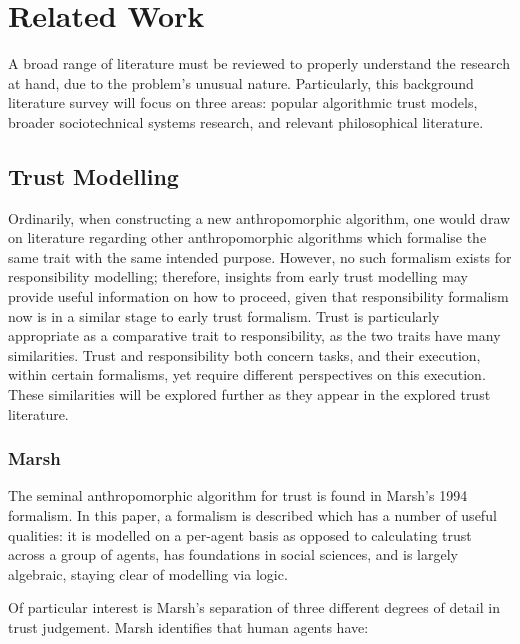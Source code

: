 \section{Related Work}\label{sec:related_work}
A broad range of literature must be reviewed to properly understand the research at hand, due to the problem's unusual nature. Particularly, this background literature survey will focus on three areas: popular algorithmic trust models, broader sociotechnical systems research, and relevant philosophical literature.\par

\subsection{Trust Modelling}
Ordinarily, when constructing a new anthropomorphic algorithm, one would draw on literature regarding other anthropomorphic algorithms which formalise the same trait with the same intended purpose. However, no such formalism exists for responsibility modelling; therefore, insights from early trust modelling may provide useful information on how to proceed, given that responsibility formalism now is in a similar stage to early trust formalism. Trust is particularly appropriate as a comparative trait to responsibility, as the two traits have many similarities. Trust and responsibility both concern tasks, and their execution, within certain formalisms, yet require different perspectives on this execution. These similarities will be explored further as they appear in the explored trust literature.\par

\subsubsection{Marsh}
The seminal anthropomorphic algorithm for trust is found in Marsh's 1994 formalism\cite{Marsh1994FormalisingConcept}. In this paper, a formalism is described which has a number of useful qualities: it is modelled on a per-agent basis as opposed to calculating trust across a group of agents, has foundations in social sciences, and is largely algebraic, staying clear of modelling via logic.

Of particular interest is Marsh's separation of three different degrees of detail in trust judgement. Marsh identifies that human agents have:

